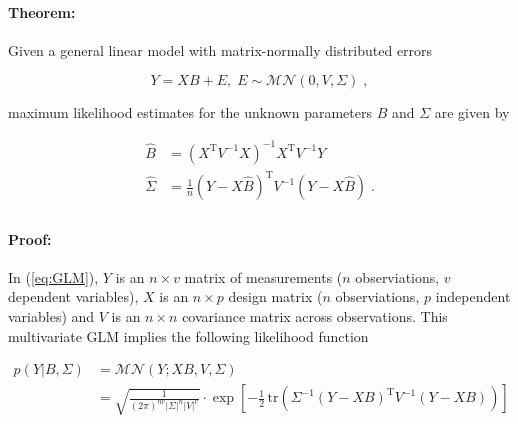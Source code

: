 

\setcounter{equation}{0}



\paragraph{Theorem:}

Given a general linear model with matrix-normally distributed errors

\begin{equation} \label{eq:GLM}
Y = X B + E, \; E \sim \mathcal{MN}(0, V, \Sigma) \; ,
\end{equation}

maximum likelihood estimates for the unknown parameters $B$ and $\Sigma$ are given by

\vspace{-0.5em}
\begin{equation} \label{eq:GLM-MLE}
\begin{split}
\hat{B} &= (X^\mathrm{T} V^{-1} X)^{-1} X^\mathrm{T} V^{-1} Y \\
\hat{\Sigma} &= \frac{1}{n} (Y - X\hat{B})^\mathrm{T} V^{-1} (Y - X\hat{B}) \; . \\
\end{split}
\end{equation}


\paragraph{Proof:} In (\ref{eq:GLM}), $Y$ is an $n \times v$ matrix of measurements ($n$ observiations, $v$ dependent variables), $X$ is an $n \times p$ design matrix ($n$ observiations, $p$ independent variables) and $V$ is an $n \times n$ covariance matrix across observations. This multivariate GLM implies the following likelihood function

\vspace{-0.5em}
\begin{equation} \label{eq:GLM-LF}
\begin{split}
p(Y|B,\Sigma) &= \mathcal{MN}(Y; XB, V, \Sigma) \\
&= \sqrt{\frac{1}{(2\pi)^{nv} |\Sigma|^n |V|^v}} \cdot \exp\left[ -\frac{1}{2} \, \mathrm{tr}\left( \Sigma^{-1} (Y - XB)^\mathrm{T} V^{-1} (Y - XB) \right)  \right] \\
\end{split}
\end{equation}

